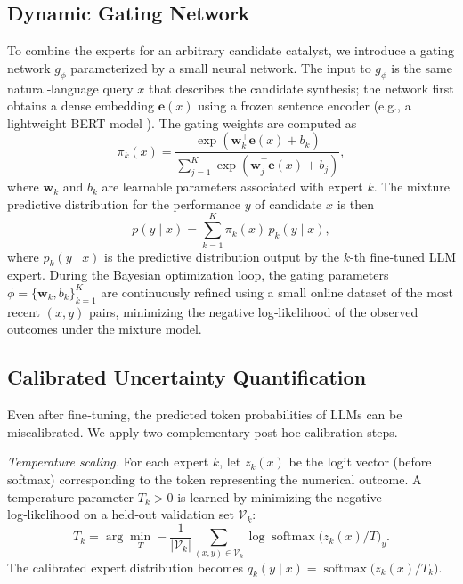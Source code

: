 \documentclass{article}
\begin{document}
\subsection{Dynamic Gating Network}

To combine the experts for an arbitrary candidate catalyst, we introduce a gating network \(g_\phi\) parameterized by a small neural network. The input to \(g_\phi\) is the same natural‑language query \(x\) that describes the candidate synthesis; the network first obtains a dense embedding \(\mathbf{e}(x)\) using a frozen sentence encoder (e.g., a lightweight BERT model \cite{devlin2019bert}). The gating weights are computed as
\begin{equation}
\pi_k(x) = \frac{\exp(\mathbf{w}_k^\top \mathbf{e}(x) + b_k)}{\sum_{j=1}^K \exp(\mathbf{w}_j^\top \mathbf{e}(x) + b_j)},
\end{equation}
where \(\mathbf{w}_k\) and \(b_k\) are learnable parameters associated with expert \(k\). The mixture predictive distribution for the performance \(y\) of candidate \(x\) is then
\begin{equation}
p(y \mid x) = \sum_{k=1}^K \pi_k(x) \, p_k(y \mid x),
\end{equation}
where \(p_k(y \mid x)\) is the predictive distribution output by the \(k\)-th fine‑tuned LLM expert. During the Bayesian optimization loop, the gating parameters \(\phi = \{\mathbf{w}_k, b_k\}_{k=1}^K\) are continuously refined using a small online dataset of the most recent \((x, y)\) pairs, minimizing the negative log‑likelihood of the observed outcomes under the mixture model.

\subsection{Calibrated Uncertainty Quantification}

Even after fine‑tuning, the predicted token probabilities of LLMs can be miscalibrated. We apply two complementary post‑hoc calibration steps.

\emph{Temperature scaling.} For each expert \(k\), let \(z_k(x)\) be the logit vector (before softmax) corresponding to the token representing the numerical outcome. A temperature parameter \(T_k > 0\) is learned by minimizing the negative log‑likelihood on a held‑out validation set \(\mathcal{V}_k\):
\begin{equation}
T_k = \arg\min_{T} -\frac{1}{|\mathcal{V}_k|}\sum_{(x,y)\in\mathcal{V}_k} \log \operatorname{softmax}\!\big(z_k(x)/T\big)_y.
\end{equation}
The calibrated expert distribution becomes \(q_k(y \mid x) = \operatorname{softmax}\!\big(z_k(x)/T_k\big)\).
\end{document}
